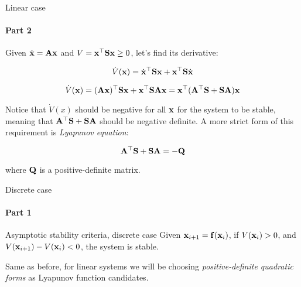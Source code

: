 \documentclass{beamer}
\begin{document}
\begin{frame}{Linear case}
\framesubtitle{Part 2}
\begin{flushleft}

Given $\dot{\mathbf{x}} = \mathbf{A}\mathbf{x}$ and $V = \mathbf{x}^\top\mathbf{S}\mathbf{x} \geq 0$, let's find its derivative:

\begin{equation}
    \dot V(\mathbf{x}) = \dot{\mathbf{x}}^\top\mathbf{S}\mathbf{x} + 
    \mathbf{x}^\top\mathbf{S}\dot{\mathbf{x}}
\end{equation}

\begin{equation}
    \dot V(\mathbf{x}) = (\mathbf{A}\mathbf{x})^\top\mathbf{S}\mathbf{x} + 
    \mathbf{x}^\top\mathbf{S}\mathbf{A}\mathbf{x} = 
    \mathbf{x}^\top(\mathbf{A}^\top\mathbf{S} + \mathbf{S}\mathbf{A})\mathbf{x}
\end{equation}

Notice that $\dot V(x)$ should be negative for all $\mathbf{x}$ for the system to be stable, meaning that $\mathbf{A}^\top\mathbf{S} + \mathbf{S}\mathbf{A}$ should be negative definite. A more strict form of this requirement is \emph{Lyapunov equation}:

\begin{equation}
    \mathbf{A}^\top\mathbf{S} + \mathbf{S}\mathbf{A} = -\mathbf{Q}
\end{equation}

where $\mathbf{Q}$ is a positive-definite matrix.

\end{flushleft}
\end{frame}



\begin{frame}{Discrete case}
\framesubtitle{Part 1}
\begin{flushleft}

\begin{block}{Asymptotic stability criteria, discrete case}
Given $\mathbf{x}_{i+1} = \mathbf{f}(\mathbf{x}_i)$, if $V(\mathbf{x}_i) > 0$, and $V(\mathbf{x}_{i+1}) - V(\mathbf{x}_i) < 0$, the system is stable.
\end{block}

\bigskip 

Same as before, for linear systems we will be choosing \emph{positive-definite quadratic forms} as Lyapunov function candidates.

\end{flushleft}
\end{frame}
\end{document}
